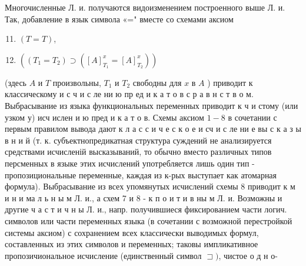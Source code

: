 \documentclass[10pt]{article}
\begin{document}
Многочисленные Л. и. получаются видоизменением построенного выше Л. и. Так, добавление в язык символа «=" вместе со схемами аксиом



\begin{enumerate}

  \setcounter{enumi}{10}

  \item $(T=T)$,



  \item $\left(\left(T_{1}=T_{2}\right) \supset\left([A]_{T_{1}}^{x}=[A]_{T_{2}}^{x}\right)\right)$



\end{enumerate}



(здесь $A$ и $T$ произвольны, $T_{1}$ и $T_{2}$ свободны для $x$ в $A$ ) приводит к классическому и с ч и с ле ни ю пр ед и к а т о в с р а в н с т в о м. Выбрасывание из языка функциональных переменных приводит к ч и стому (или узком у) исч ислен и ю пред и к а т о в. Схемы аксиом $1-8$ в сочетании с первым правилом вывода дают к л а с с и ч е с к о е и сч и с ле ни е вы с к а з ы в н и й (т. к. субъектнопредикатная структура суждений не анализируется средствами исчисленій высказываний, то обычно вместо различных типов персменных в языке этих исчислений употребляется лишь один тип - пропозициональные переменные, каждая из к-рых выступает как атомарная формула). Выбрасывание из всех упомянутых исчислений схемы 8 приводит к м и н и ма л ь н ы м Л. и., а схем 7 и 8 - к п о и т и в ны м Л. и. Возможны и другие ч а с т и ч н ы Л. и., напр. получившиеся фиксированием части логич. символов или части переменных языка (в сочетании с возможной перестройкой системы аксиом) с сохранением всех классически выводимых формул, составленных из этих символов и переменных; таковы импликативное пропозичиональное исчисление (единственный символ $\sqsupset)$, чистое о д н о-
\end{document}
